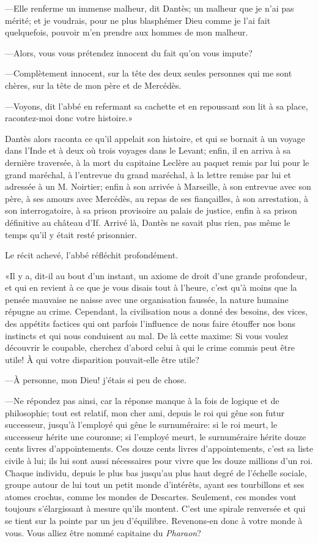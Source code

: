 —Elle renferme un immense malheur, dit Dantès; un malheur que je n'ai pas mérité; et je voudrais, pour ne plus blasphémer Dieu comme je l'ai fait quelquefois, pouvoir m'en prendre aux hommes de mon malheur.

—Alors, vous vous prétendez innocent du fait qu'on vous impute?

—Complètement innocent, sur la tête des deux seules personnes qui me sont chères, sur la tête de mon père et de Mercédès.

—Voyons, dit l'abbé en refermant sa cachette et en repoussant son lit à sa place, racontez-moi donc votre histoire.»

Dantès alors raconta ce qu'il appelait son histoire, et qui se bornait à un voyage dans l'Inde et à deux où trois voyages dans le Levant; enfin, il en arriva à sa dernière traversée, à la mort du capitaine Leclère au paquet remis par lui pour le grand maréchal, à l'entrevue du grand maréchal, à la lettre remise par lui et adressée à un M. Noirtier; enfin à son arrivée à Marseille, à son entrevue avec son père, à ses amours avec Mercédès, au repas de ses fiançailles, à son arrestation, à son interrogatoire, à sa prison provisoire au palais de justice, enfin à sa prison définitive au château d'If. Arrivé là, Dantès ne savait plus rien, pas même le temps qu'il y était resté prisonnier.

Le récit achevé, l'abbé réfléchit profondément.

«Il y a, dit-il au bout d'un instant, un axiome de droit d'une grande profondeur, et qui en revient à ce que je vous disais tout à l'heure, c'est qu'à moins que la pensée mauvaise ne naisse avec une organisation faussée, la nature humaine répugne au crime. Cependant, la civilisation nous a donné des besoins, des vices, des appétits factices qui ont parfois l'influence de nous faire étouffer nos bons instincts et qui nous conduisent au mal. De là cette maxime: Si vous voulez découvrir le coupable, cherchez d'abord celui à qui le crime commis peut être utile! À qui votre disparition pouvait-elle être utile?

—À personne, mon Dieu! j'étais si peu de chose.

—Ne répondez pas ainsi, car la réponse manque à la fois de logique et de philosophie; tout est relatif, mon cher ami, depuis le roi qui gêne son futur successeur, jusqu'à l'employé qui gêne le surnuméraire: si le roi meurt, le successeur hérite une couronne; si l'employé meurt, le surnuméraire hérite douze cents livres d'appointements. Ces douze cents livres d'appointements, c'est sa liste civile à lui; ils lui sont aussi nécessaires pour vivre que les douze millions d'un roi. Chaque individu, depuis le plus bas jusqu'au plus haut degré de l'échelle sociale, groupe autour de lui tout un petit monde d'intérêts, ayant ses tourbillons et ses atomes crochus, comme les mondes de Descartes. Seulement, ces mondes vont toujours s'élargissant à mesure qu'ils montent. C'est une spirale renversée et qui se tient sur la pointe par un jeu d'équilibre. Revenons-en donc à votre monde à vous. Vous alliez être nommé capitaine du \textit{Pharaon}?

